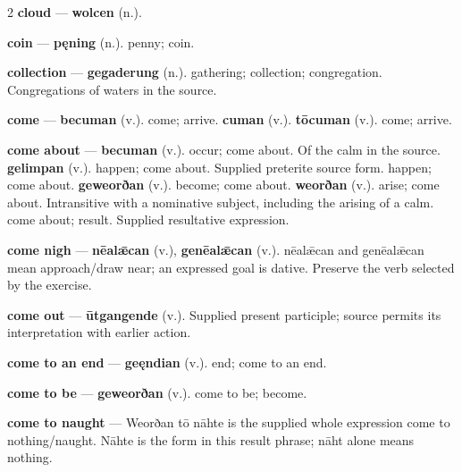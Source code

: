 \begin{multicols}{2}
\textbf{cloud} — \textbf{wolcen} (n.).\par
\textbf{coin} — \textbf{pęning} (n.). penny; coin.\par
\textbf{collection} — \textbf{gegaderung} (n.). gathering; collection; congregation. Congregations of waters in the source.\par
\textbf{come} — \textbf{becuman} (v.). come; arrive. \textbf{cuman} (v.).  \textbf{tōcuman} (v.). come; arrive.\par
\textbf{come about} — \textbf{becuman} (v.). occur; come about. Of the calm in the source. \textbf{gelimpan} (v.). happen; come about. Supplied preterite source form. happen; come about. \textbf{geweorðan} (v.). become; come about. \textbf{weorðan} (v.). arise; come about. Intransitive with a nominative subject, including the arising of a calm. come about; result. Supplied resultative expression.\par
\textbf{come nigh} — \textbf{nēalǣcan} (v.), \textbf{genēalǣcan} (v.). nēalǣcan and genēalǣcan mean approach/draw near; an expressed goal is dative. Preserve the verb selected by the exercise.\par
\textbf{come out} — \textbf{ūtgangende} (v.). Supplied present participle; source permits its interpretation with earlier action.\par
\textbf{come to an end} — \textbf{geęndian} (v.). end; come to an end.\par
\textbf{come to be} — \textbf{geweorðan} (v.). come to be; become.\par
\textbf{come to naught} — Weorðan tō nāhte is the supplied whole expression come to nothing/naught. Nāhte is the form in this result phrase; nāht alone means nothing.\par

\end{multicols}
